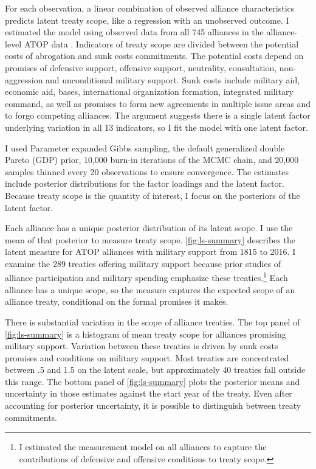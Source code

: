 \documentclass[12pt]{article}
\begin{document}
For each observation, a linear combination of observed alliance characteristics predicts latent treaty scope, like a regression with an unobserved outcome.  
I estimated the model using observed data from all 745 alliances in the alliance-level ATOP data \citep{Leedsetal2002}. 
Indicators of treaty scope are divided between the potential costs of abrogation and sunk costs commitments.
The potential costs depend on promises of defensive support, offensive support, neutrality, consultation, non-aggression and unconditional military support. 
Sunk costs include military aid, economic aid, bases, international organization formation, integrated military command, as well as promises to form new agreements in multiple issue areas and to forgo competing alliances. 
The argument suggests there is a single latent factor underlying variation in all 13 indicators, so I fit the model with one latent factor. 


I used Parameter expanded Gibbs sampling, the default generalized double Pareto (GDP) prior, 10,000 burn-in iterations of the MCMC chain, and 20,000 samples thinned every 20 observations to ensure convergence. 
The estimates include posterior distributions for the factor loadings and the latent factor. 
Because treaty scope is the quantity of interest, I focus on the posteriors of the latent factor. 


Each alliance has a unique posterior distribution of its latent scope. 
I use the mean of that posterior to measure treaty scope. 
\autoref{fig:ls-summary} describes the latent measure for ATOP alliances  with military support from 1815 to 2016.
I examine the 289 treaties offering military support because prior studies of alliance participation and military spending emphasize these treaties.\footnote{
I estimated the measurement model on all alliances to capture the contributions of defensive and offensive conditions to treaty scope.}
Each alliance has a unique scope, so the measure captures the expected scope of an alliance treaty, conditional on the formal promises it makes. 


There is substantial variation in the scope of alliance treaties. 
The top panel of \autoref{fig:ls-summary} is a histogram of mean treaty scope for alliances promising military support. 
Variation between these treaties is driven by sunk costs promises and conditions on military support. 
Most treaties are concentrated between .5 and 1.5 on the latent scale, but approximately 40 treaties fall outside this range. 
The bottom panel of \autoref{fig:ls-summary} plots the posterior means and uncertainty in those estimates against the start year of the treaty. 
Even after accounting for posterior uncertainty, it is possible to distinguish between treaty commitments. 
\end{document}
